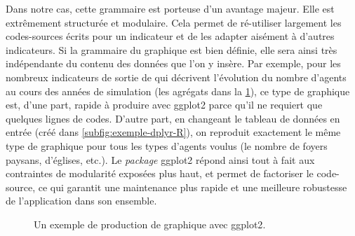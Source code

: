 Dans notre cas, cette grammaire est porteuse d'un avantage majeur.
Elle est extrêmement structurée et modulaire.
Cela permet de ré-utiliser largement les codes-sources écrits pour un indicateur et de les adapter aisément à d'autres indicateurs.
Si la grammaire du graphique est bien définie, elle sera ainsi très indépendante du contenu des données que l'on y insère.
Par exemple, pour les nombreux indicateurs de sortie de \simfeodal{} qui décrivent l'évolution du nombre d'agents au cours des années de simulation (les agrégats dans la \cref{fig:exemple-ggplot2-simedb}), ce type de graphique est, d'une part, rapide à produire avec \textsf{ggplot2} parce qu'il ne requiert que quelques lignes de codes.
D'autre part, en changeant le tableau de données en entrée (créé dans \cref{subfig:exemple-dplyr-R}), on reproduit exactement le même type de graphique pour tous les types d'agents voulus (le nombre de foyers paysans, d'églises, etc.).
Le \textit{package} \textsf{ggplot2} répond ainsi tout à fait aux contraintes de modularité exposées plus haut, et permet de factoriser le code-source, ce qui garantit une maintenance plus rapide et une meilleure robustesse de l'application dans son ensemble.


\begin{figure}[H]
	\centering
	\hspace{5pt}
	\hspace{5pt}
	\caption{Un exemple de production de graphique avec \textsf{ggplot2}.}
	\label{fig:exemple-ggplot2-simedb}
\end{figure}

